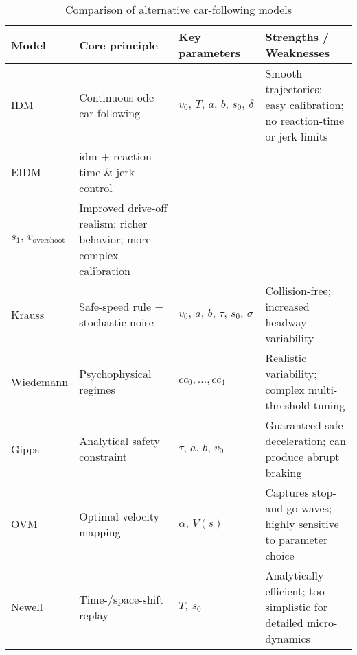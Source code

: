 \begin{table}[ht]
  \centering
  \caption{Comparison of alternative car-following models}
  \label{tab:cf_comparison}
  \begin{tabularx}{\textwidth}{%
      >{\raggedright\arraybackslash}p{2.5cm}   %
      >{\raggedright\arraybackslash}p{3cm}     %
      >{\raggedright\arraybackslash}p{3cm}     %
      >{\raggedright\arraybackslash}X          %
    }
    \toprule
    Model   & Core principle                       & Key parameters                                & Strengths / Weaknesses                                                 \\
    \midrule
    IDM     & Continuous \ac{ode} car-following     & \(v_0,\,T,\,a,\,b,\,s_0,\,\delta\)             & Smooth trajectories; easy calibration; no reaction-time or jerk limits  \\
    EIDM    & \ac{idm} + reaction-time \& jerk control    & \makecell{%
                 \(\tau_r,\,\sigma_p,\,J_{\max},\)\\%
                 \(s_1,\,v_{\text{overshoot}}\)}         & Improved drive-off realism; richer behavior; more complex calibration   \\
    Krauss  & Safe-speed rule + stochastic noise     & \(v_0,\,a,\,b,\,\tau,\,s_0,\,\sigma\)         & Collision-free; increased headway variability                            \\
    Wiedemann & Psychophysical regimes               & \(cc_0,\dots,cc_4\)                           & Realistic variability; complex multi-threshold tuning                   \\
    Gipps   & Analytical safety constraint           & \(\tau,\,a,\,b,\,v_0\)                        & Guaranteed safe deceleration; can produce abrupt braking                \\
    OVM     & Optimal velocity mapping               & \(\alpha,\,V(s)\)                             & Captures stop-and-go waves; highly sensitive to parameter choice        \\
    Newell  & Time-/space-shift replay               & \(T,\,s_0\)                                   & Analytically efficient; too simplistic for detailed micro-dynamics      \\
    \bottomrule
  \end{tabularx}
\end{table}

